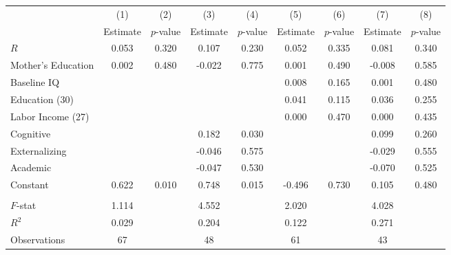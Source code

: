 \begin{tabular}{lcccccccc} \toprule
 & (1) & (2) & (3) & (4) & (5) & (6) & (7) & (8) \\ 
 & Estimate  & $p$-value  & Estimate  & $p$-value  & Estimate  & $p$-value  & Estimate  & $p$-value  \\  \midrule
$R$ &     0.053 &     0.320 &     0.107 &     0.230 &     0.052 &     0.335 &     0.081 &     0.340 \\  
Mother's Education &     0.002 &     0.480 &    -0.022 &     0.775 &     0.001 &     0.490 &    -0.008 &     0.585 \\  
Baseline IQ &         &         &         &         &     0.008 &     0.165 &     0.001 &     0.480 \\  
Education (30) &         &         &         &         &     0.041 &     0.115 &     0.036 &     0.255 \\  
Labor Income (27) &         &         &         &         &     0.000 &     0.470 &     0.000 &     0.435 \\  
Cognitive &         &         &     0.182 &     0.030 &         &         &     0.099 &     0.260 \\  
Externalizing &         &         &    -0.046 &     0.575 &         &         &    -0.029 &     0.555 \\  
Academic &         &         &    -0.047 &     0.530 &         &         &    -0.070 &     0.525 \\  
Constant &     0.622 &     0.010 &     0.748 &     0.015 &    -0.496 &     0.730 &     0.105 &     0.480 \\ \\ \midrule
$F$-stat &     1.114 &         &     4.552 &         &     2.020 &         &     4.028 &         \\  
$R^2$ &     0.029 &         &     0.204 &         &     0.122 &         &     0.271 &         \\  
Observations &    67 &         &    48 &         &    61 &         &    43 &         \\  
\bottomrule
\end{tabular}

